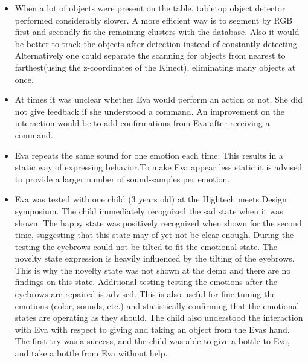 \documentclass[project_eva.tex]{subfiles}
\begin{document}
\begin{itemize}
\item When a lot of objects were present on the table, tabletop object detector performed considerably slower. A more efficient way is to segment by RGB first and secondly fit the remaining clusters with the database. Also it would be better to track the objects after detection instead of constantly detecting. Alternatively one could separate the scanning for objects from nearest to farthest(using the z-coordinates of the Kinect), eliminating many objects at once.

\item At times it was unclear whether Eva would perform an action or not. She did not give feedback if she understood a command. An improvement on the interaction would be to add confirmations from Eva after receiving a command.

\item Eva repeats the same sound for one emotion each time. This results in a static way of expressing behavior.To make Eva appear less static it is advised to provide a larger number of sound-samples per emotion.

\item Eva was tested with one child (3 years old) at the Hightech meets Design symposium. The child immediately recognized the sad state when it was shown. The happy state was positively recognized when shown for the second time, suggesting that this state may of yet not be clear enough.  During the testing the eyebrows could not be tilted to fit the emotional state. The novelty state expression is heavily influenced by the tilting of the eyebrows. This is why the novelty state was not shown at the demo and there are no findings on this state. Additional testing testing the emotions after the eyebrows are repaired is advised. This is also useful for fine-tuning the emotions (color, sounds, etc.) and statistically confirming that the emotional states are operating as they should.
The child also understood the interaction with Eva with respect to giving and taking an object from the Eva\textquotesingle s hand. The first try was a success, and the child was able to give a bottle to Eva, and take a bottle from Eva without help.
\end{itemize}
\end{document}
